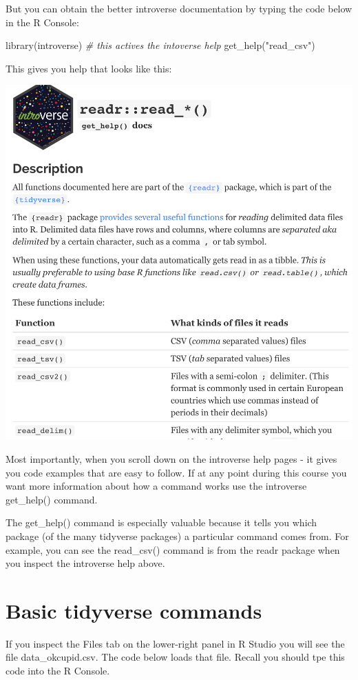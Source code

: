 \documentclass[
]{krantz}
\makeatletter
\newenvironment{Shaded}{\begin{snugshade}}{\end{snugshade}}
\newcommand{\CommentTok}[1]{\textcolor[rgb]{0.37,0.37,0.37}{\textit{#1}}}
\newcommand{\FunctionTok}[1]{\textcolor[rgb]{0,0,0}{#1}}
\newcommand{\NormalTok}[1]{#1}
\newcommand{\StringTok}[1]{\textcolor[rgb]{0.5,0.5,0.5}{#1}}
\newenvironment{kframe}{%
\medskip{}
\setlength{\fboxsep}{.8em}
 \def\at@end@of@kframe{}%
 \ifinner\ifhmode%
  \def\at@end@of@kframe{\end{minipage}}%
  \begin{minipage}{\columnwidth}%
 \fi\fi%
 \def\FrameCommand##1{\hskip\@totalleftmargin \hskip-\fboxsep
 \colorbox{shadecolor}{##1}\hskip-\fboxsep
     \hskip-\linewidth \hskip-\@totalleftmargin \hskip\columnwidth}%
 \MakeFramed {\advance\hsize-\width
   \@totalleftmargin\z@ \linewidth\hsize
   \@setminipage}}%
 {\par\unskip\endMakeFramed%
 \at@end@of@kframe}
\renewenvironment{Shaded}{\begin{kframe}}{\end{kframe}}
\makeatother
\begin{document}
But you can obtain the better introverse documentation by typing the code below in the R Console:

\begin{Shaded}
\begin{Highlighting}[]
\FunctionTok{library}\NormalTok{(introverse) }\CommentTok{\# this actives the intoverse help}
\FunctionTok{get\_help}\NormalTok{(}\StringTok{"read\_csv"}\NormalTok{)}
\end{Highlighting}
\end{Shaded}

This gives you help that looks like this:

\includegraphics[width=0.7\linewidth]{ch_tidy_intro/images/screenshot_introverse_help}

Most importantly, when you scroll down on the introverse help pages - it gives you code examples that are easy to follow. If at any point during this course you want more information about how a command works use the introverse get\_help() command.

The get\_help() command is especially valuable because it tells you which package (of the many tidyverse packages) a particular command comes from. For example, you can see the read\_csv() command is from the readr package when you inspect the introverse help above.

\hypertarget{basic-tidyverse-commands}{%
\section{Basic tidyverse commands}\label{basic-tidyverse-commands}}

If you inspect the Files tab on the lower-right panel in R Studio you will see the file data\_okcupid.csv. The code below loads that file. Recall you should tpe this code into the R Console.
\end{document}
